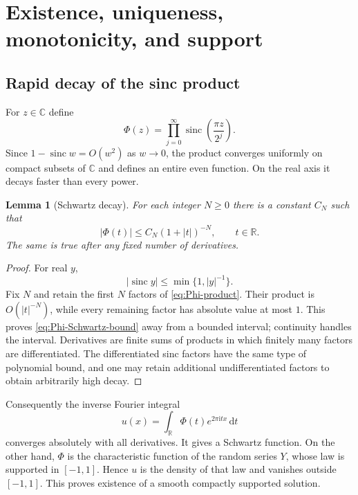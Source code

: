 \documentclass[11pt,oneside]{article}
\newtheorem{lemma}[theorem]{Lemma}
\theoremstyle{definition}
\theoremstyle{remark}
\newcommand{\sinc}{\operatorname{sinc}}
\newcommand{\dd}{\,\mathrm d}
\newcommand{\ii}{\mathrm i}
\newcommand{\R}{\mathbb R}
\newcommand{\C}{\mathbb C}
\begin{document}
\section{Existence, uniqueness, monotonicity, and support}\label{sec:existence-uniqueness}

\subsection{Rapid decay of the sinc product}

For $z\in\C$ define
\begin{equation}\label{eq:Phi-product}
  \Phi(z)=\prod_{j=0}^{\infty}\sinc\left(\frac{\pi z}{2^j}\right).
\end{equation}
Since $1-\sinc w=O(w^2)$ as $w\to0$, the product converges uniformly on compact
subsets of $\C$ and defines an entire even function.  On the real axis it decays
faster than every power.

\begin{lemma}[Schwartz decay]\label{lem:Phi-Schwartz}
For each integer $N\ge0$ there is a constant $C_N$ such that
\begin{equation}\label{eq:Phi-Schwartz-bound}
  |\Phi(t)|\le C_N(1+|t|)^{-N},\qquad t\in\R.
\end{equation}
The same is true after any fixed number of derivatives.
\end{lemma}

\begin{proof}
For real $y$,
\[
  |\sinc y|\le\min\{1,|y|^{-1}\}.
\]
Fix $N$ and retain the first $N$ factors of \eqref{eq:Phi-product}.  Their product
is $O(|t|^{-N})$, while every remaining factor has absolute value at most $1$.
This proves \eqref{eq:Phi-Schwartz-bound} away from a bounded interval; continuity
handles the interval.  Derivatives are finite sums of products in which finitely
many factors are differentiated.  The differentiated sinc factors have the same
type of polynomial bound, and one may retain additional undifferentiated factors
to obtain arbitrarily high decay.
\end{proof}

Consequently the inverse Fourier integral
\begin{equation}\label{eq:up-inverse-def}
  u(x)=\int_{\R}\Phi(t)e^{2\pi\ii tx}\dd t
\end{equation}
converges absolutely with all derivatives.  It gives a Schwartz function.  On the
other hand, $\Phi$ is the characteristic function of the random series $Y$, whose
law is supported in $[-1,1]$.  Hence $u$ is the density of that law and vanishes
outside $[-1,1]$.  This proves existence of a smooth compactly supported solution.
\end{document}
